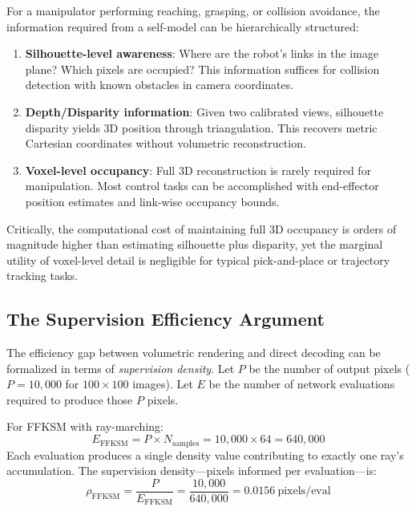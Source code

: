 \documentclass[12pt,a4paper,oneside]{report}
\begin{document}
For a manipulator performing reaching, grasping, or collision avoidance, the information required from a self-model can be hierarchically structured:

\begin{enumerate}
    \item \textbf{Silhouette-level awareness}: Where are the robot's links in the image plane? Which pixels are occupied? This information suffices for collision detection with known obstacles in camera coordinates.
    \item \textbf{Depth/Disparity information}: Given two calibrated views, silhouette disparity yields 3D position through triangulation. This recovers metric Cartesian coordinates without volumetric reconstruction.
    \item \textbf{Voxel-level occupancy}: Full 3D reconstruction is rarely required for manipulation. Most control tasks can be accomplished with end-effector position estimates and link-wise occupancy bounds.
\end{enumerate}

Critically, the computational cost of maintaining full 3D occupancy is orders of magnitude higher than estimating silhouette plus disparity, yet the marginal utility of voxel-level detail is negligible for typical pick-and-place or trajectory tracking tasks.

\subsection{The Supervision Efficiency Argument}
\label{subsec:the_supervision_efficiency_argument}

The efficiency gap between volumetric rendering and direct decoding can be formalized in terms of \textit{supervision density}. Let $P$ be the number of output pixels ($P = 10,000$ for $100 \times 100$ images). Let $E$ be the number of network evaluations required to produce those $P$ pixels.

For FFKSM with ray-marching:
\begin{equation}
E_{\text{FFKSM}} = P \times N_{\text{samples}} = 10,000 \times 64 = 640,000
\end{equation}
Each evaluation produces a single density value contributing to exactly one ray's accumulation. The supervision density—pixels informed per evaluation—is:
\begin{equation}
\rho_{\text{FFKSM}} = \frac{P}{E_{\text{FFKSM}}} = \frac{10,000}{640,000} = 0.0156\ \text{pixels/eval}
\end{equation}
\end{document}
